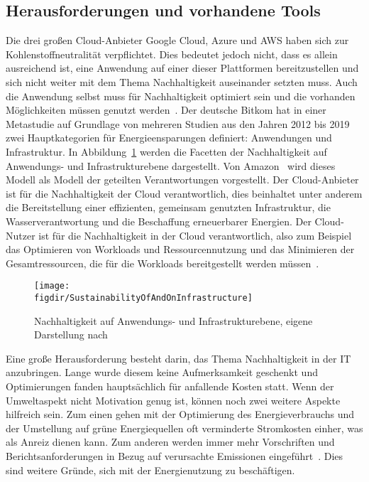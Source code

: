 \subsection{Herausforderungen und vorhandene Tools}
Die drei großen Cloud-Anbieter Google Cloud, Azure und AWS haben sich zur Kohlenstoffneutralität verpflichtet.
Dies bedeutet jedoch nicht, dass es allein ausreichend ist, eine Anwendung auf einer dieser Plattformen bereitzustellen und sich nicht weiter mit dem Thema Nachhaltigkeit auseinander setzten muss.
Auch die Anwendung selbst muss für Nachhaltigkeit optimiert sein und die vorhanden Möglichkeiten müssen genutzt werden~\cite{Newman.2023}.
Der deutsche Bitkom hat in einer Metastudie auf Grundlage von mehreren Studien aus den Jahren 2012 bis 2019 zwei Hauptkategorien für Energieensparungen definiert: Anwendungen und Infrastruktur.
In Abbildung~\ref{FIG:sustainability-infrastructure} werden die Facetten der Nachhaltigkeit auf Anwendungs- und Infrastrukturebene dargestellt.
Von Amazon~\cite{Mokhtari.2023} wird dieses Modell als Modell der geteilten Verantwortungen vorgestellt.
Der Cloud-Anbieter ist für die Nachhaltigkeit der Cloud verantwortlich, dies beinhaltet unter anderem die Bereitstellung einer effizienten, gemeinsam genutzten Infrastruktur, die Wasserverantwortung und die Beschaffung erneuerbarer Energien.
Der Cloud-Nutzer ist für die Nachhaltigkeit in der Cloud verantwortlich, also zum Beispiel das Optimieren von Workloads und Ressourcennutzung und das Minimieren der Gesamtressourcen, die für die Workloads bereitgestellt werden müssen~\cite{Mokhtari.2023}.
\begin{figure}
 \caption{Nachhaltigkeit auf Anwendungs- und Infrastrukturebene, eigene Darstellung nach ~\cite{Mokhtari.2023}}
 {\texttt{[image: \\figdir/SustainabilityOfAndOnInfrastructure]}}
 \label{FIG:sustainability-infrastructure}
\end{figure}

Eine große Herausforderung besteht darin, das Thema Nachhaltigkeit in der IT anzubringen.
Lange wurde diesem keine Aufmerksamkeit geschenkt und Optimierungen fanden hauptsächlich für anfallende Kosten statt.
Wenn der Umweltaspekt nicht Motivation genug ist, können noch zwei weitere Aspekte hilfreich sein.
Zum einen gehen mit der Optimierung des Energieverbrauchs und der Umstellung auf grüne Energiequellen oft verminderte Stromkosten einher, was als Anreiz dienen kann.
Zum anderen werden immer mehr Vorschriften und Berichtsanforderungen in Bezug auf verursachte Emissionen eingeführt~\cite{expand}.
Dies sind weitere Gründe, sich mit der Energienutzung zu beschäftigen.

